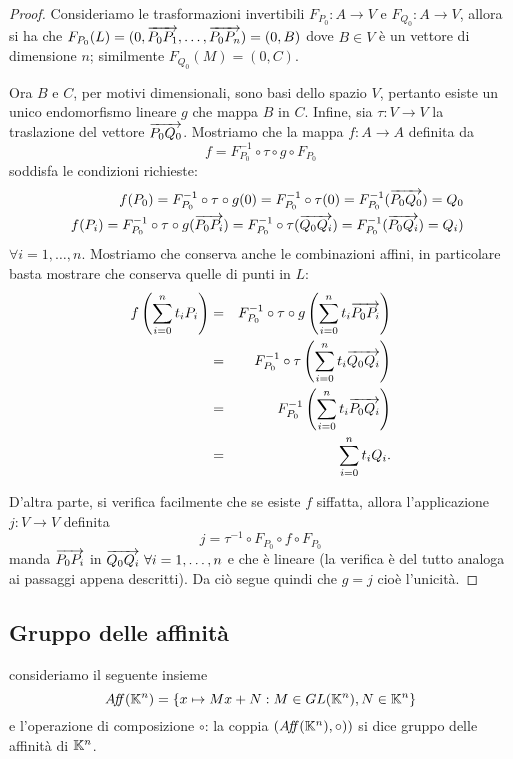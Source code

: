  \begin{proof}
 Consideriamo le trasformazioni invertibili $F_{P_0}:A\rightarrow V$ e $F_{Q_0}:A\rightarrow V$,
 allora si ha che $F_{P_0}(L)=(0,\overrightarrow{P_0P_1},\dots,\overrightarrow{P_0P_n})=(0,B)$ dove $B\in V$ è un vettore
 di dimensione $n$; similmente $F_{Q_0}(M)=(0,C).$
 
 Ora $B$ e $C$, per motivi dimensionali, sono basi dello spazio $V$, pertanto esiste un unico endomorfismo lineare
 $g$ che mappa $B$ in $C$. Infine, sia $\tau:V\rightarrow V$ la traslazione del vettore
 $\overrightarrow{P_0Q_0}$. Mostriamo che la mappa $f:A\rightarrow A$ definita da
 \[
	f = F_{P_0}^{-1} \circ \tau \circ g \circ F_{P_0}
 \]
 soddisfa le condizioni richieste:
 \begin{eqnarray*}
	&&f(P_0)=F_{P_0}^{-1} \circ \tau \circ g (0) = F_{P_0}^{-1} \circ \tau (0) = F_{P_0}^{-1} (\overrightarrow{P_0Q_0}) = Q_0\\
	&&f(P_i)=F_{P_0}^{-1} \circ \tau \circ g (\overrightarrow{P_0P_i}) = F_{P_0}^{-1} \circ \tau (\overrightarrow{Q_0Q_i}) = F_{P_0}^{-1} (\overrightarrow{P_0Q_i}) = Q_i)
 \end{eqnarray*}
 $\forall i=1,\dots,n.$
 Mostriamo che conserva anche le combinazioni affini, in particolare basta mostrare che conserva quelle di punti in $L$:
 \begin{eqnarray*}
	f\left(\sum_{i=0}^{n}t_iP_i\right)&=&F_{P_0}^{-1} \circ \tau \circ g \left(\sum_{i=0}^{n}t_i\overrightarrow{P_0P_i}\right)\\
	&=&F_{P_0}^{-1} \circ \tau \left( \sum_{i=0}^{n}t_i\overrightarrow{Q_0Q_i}\right) \\
	&=&F_{P_0}^{-1} \left(\sum_{i=0}^{n}t_i\overrightarrow{P_0Q_i}\right)\\
	&=&\sum_{i=0}^{n}t_iQ_i.
 \end{eqnarray*}
 
 D'altra parte, si verifica facilmente che se esiste $f$ siffatta, allora l'applicazione $j:V\rightarrow V$ 
 definita
 \[
	j = \tau^{-1} \circ F_{P_0} \circ f \circ F_{P_0}
 \]
 manda  $\overrightarrow{P_0P_i}$ in $\overrightarrow{Q_0Q_i}\ \forall i=1,\dots,n$
 e che è lineare (la verifica è del tutto analoga ai passaggi appena descritti). Da ciò segue quindi che  $g=j$ 
 cioè l'unicità.
 \end{proof}
 
	\subsection{Gruppo delle affinità}
 
 \begin{definition}
 consideriamo il seguente insieme
 \[
	A\!f\!\!f(\mathbb K^n)=\{x\mapsto Mx+N : M\in GL(\mathbb K^n), N\in \mathbb K^n\}
 \]
 e l'operazione di composizione $\circ$: la coppia $(A\!f\!\!f(\mathbb K^n),\circ))$ si dice gruppo delle affinità di $\mathbb K^n$.
 \end{definition}
 

